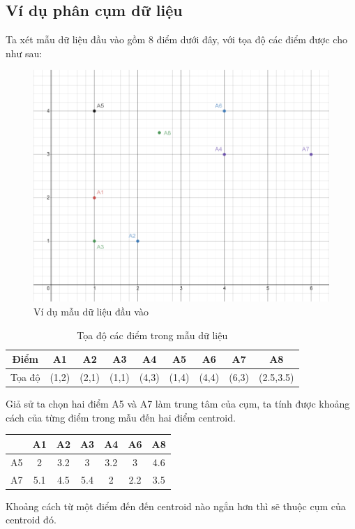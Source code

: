\documentclass{article}
\begin{document}
	\subsection{Ví dụ phân cụm dữ liệu}
	Ta xét mẫu dữ liệu đầu vào gồm 8 điểm dưới đây, với tọa độ các điểm được cho như sau:
		\begin{figure}[h]
			\centering
			\includegraphics[width=0.7\linewidth]{img/ex_1}
			\caption{Ví dụ mẫu dữ liệu đầu vào}
		\end{figure}\par
	\begin{table}[h]
		\centering
		\begin{tabular}{|c|c|c|c|c|c|c|c|c|}
			\hline
			Điểm & A1 & A2 & A3 & A4 & A5 & A6 & A7 & A8 \\
			\hline
			Tọa độ & (1,2) & (2,1) & (1,1) & (4,3) & (1,4) & (4,4) & (6,3) & (2.5,3.5) \\
			\hline
		\end{tabular}\par
		\caption{Tọa độ các điểm trong mẫu dữ liệu}
	\end{table}
	Giả sử ta chọn hai điểm A5 và A7 làm trung tâm của cụm, ta tính được khoảng cách của từng điểm trong mẫu đến hai điểm centroid.\par
	\begin{table}[h]
		\centering
		\begin{tabular}{|c|c|c|c|c|c|c|}
			\hline
			& A1 & A2 & A3 & A4 & A6 & A8 \\
			\hline
			A5 & 2 & 3.2 & 3 & 3.2 & 3 & 4.6 \\
			\hline
			A7 & 5.1 & 4.5 & 5.4 & 2 & 2.2 & 3.5 \\
			\hline
		\end{tabular}
	\end{table}
	\newpage
	Khoảng cách từ một điểm đến đến centroid nào ngắn hơn thì sẽ thuộc cụm của centroid đó.
\end{document}
